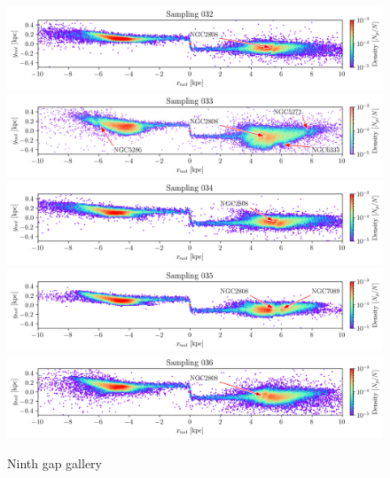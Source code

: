 \documentclass{aa}
\begin{document}
\begin{appendix}
    \begin{figure}
      \centering
      \includegraphics[width=\linewidth]{gallery_of_gaps_monte-carlo-032.png}
      \includegraphics[width=\linewidth]{gallery_of_gaps_monte-carlo-033.png}
      \includegraphics[width=\linewidth]{gallery_of_gaps_monte-carlo-034.png}      
      \includegraphics[width=\linewidth]{gallery_of_gaps_monte-carlo-035.png}
      \includegraphics[width=\linewidth]{gallery_of_gaps_monte-carlo-036.png}      
      \caption{Ninth gap gallery}
      \label{fig:gallery8}
      \end{figure}    




\end{appendix}
\end{document}

